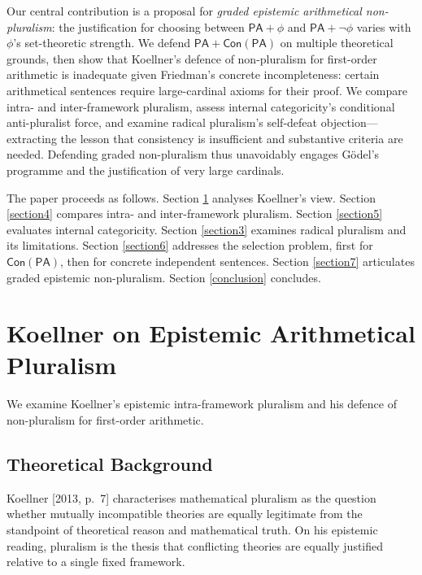 \documentclass[a4paper,12pt]{amsart}
\theoremstyle{definition}
\numberwithin{equation}{section}
\begin{document}
Our central contribution is a proposal for \emph{graded epistemic arithmetical non-pluralism}: the justification for choosing between $\mathsf{PA}+\phi$ and $\mathsf{PA}+\neg\phi$ varies with \(\phi\)'s set-theoretic strength. We defend $\mathsf{PA}+\mathsf{Con}(\mathsf{PA})$ on multiple theoretical grounds, then show that Koellner's defence of non-pluralism for first-order arithmetic is inadequate given Friedman's concrete incompleteness: certain arithmetical sentences require large-cardinal axioms for their proof. We compare intra- and inter-framework pluralism, assess internal categoricity's conditional anti-pluralist force, and examine radical pluralism's self-defeat objection---extracting the lesson that consistency is insufficient and substantive criteria are needed. Defending graded non-pluralism thus unavoidably engages G\"odel's programme and the justification of very large cardinals.

The paper proceeds as follows. Section \ref{section2} analyses Koellner's view. Section \ref{section4} compares intra- and inter-framework pluralism. Section \ref{section5} evaluates internal categoricity. Section \ref{section3} examines radical pluralism and its limitations. Section \ref{section6} addresses the selection problem, first for \(\mathsf{Con}(\mathsf{PA})\), then for concrete independent sentences. Section \ref{section7} articulates graded epistemic non-pluralism. Section \ref{conclusion} concludes. 
     


 
\section{Koellner on Epistemic Arithmetical Pluralism}\label{section2}

We examine Koellner's epistemic intra-framework pluralism and his defence of non-pluralism for first-order arithmetic.

\subsection{Theoretical Background}\label{section2.1}

Koellner [2013, p.~7] characterises mathematical pluralism as the question whether mutually incompatible theories are equally legitimate from the standpoint of theoretical reason and mathematical truth. On his epistemic reading, pluralism is the thesis that conflicting theories are equally justified relative to a single fixed framework.
 
\end{document}
